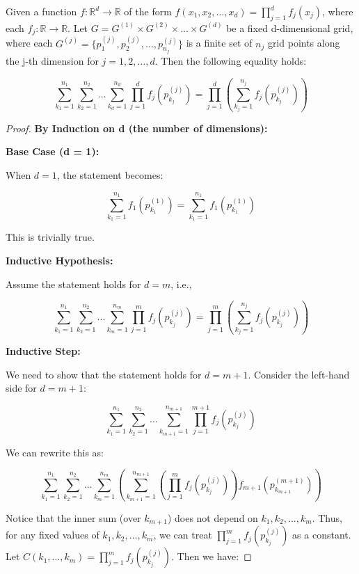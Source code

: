 
\begin{lemma}\label{lemma:switch-sum-product}
Given a function $f: \mathbb{R}^d \rightarrow \mathbb{R}$ of the form $f(x_1, x_2, ..., x_d) = \prod_{j=1}^d f_j(x_j)$, where each $f_j: \mathbb{R} \rightarrow \mathbb{R}$. Let $G = G^{(1)} \times G^{(2)} \times ... \times G^{(d)}$ be a fixed d-dimensional grid, where each $G^{(j)} = \{p_1^{(j)}, p_2^{(j)}, ..., p_{n_j}^{(j)}\}$ is a finite set of $n_j$ grid points along the j-th dimension for $j = 1, 2, ..., d$. Then the following equality holds:

$$
\sum_{k_1=1}^{n_1} \sum_{k_2=1}^{n_2} ... \sum_{k_d=1}^{n_d} \prod_{j=1}^d f_j(p_{k_j}^{(j)}) = \prod_{j=1}^d \left( \sum_{k_j=1}^{n_j} f_j(p_{k_j}^{(j)}) \right)
$$
\end{lemma}
\begin{proof}
\textbf{By Induction on d (the number of dimensions):}

\textbf{Base Case (d = 1):}

When $d=1$, the statement becomes:

$$
\sum_{k_1=1}^{n_1} f_1(p_{k_1}^{(1)}) = \sum_{k_1=1}^{n_1} f_1(p_{k_1}^{(1)})
$$

This is trivially true.

\textbf{Inductive Hypothesis:}

Assume the statement holds for $d = m$, i.e.,

$$
\sum_{k_1=1}^{n_1} \sum_{k_2=1}^{n_2} ... \sum_{k_m=1}^{n_m} \prod_{j=1}^m f_j(p_{k_j}^{(j)}) = \prod_{j=1}^m \left( \sum_{k_j=1}^{n_j} f_j(p_{k_j}^{(j)}) \right)
$$

\textbf{Inductive Step:}

We need to show that the statement holds for $d = m+1$. Consider the left-hand side for $d = m+1$:

$$
\sum_{k_1=1}^{n_1} \sum_{k_2=1}^{n_2} ... \sum_{k_{m+1}=1}^{n_{m+1}} \prod_{j=1}^{m+1} f_j(p_{k_j}^{(j)})
$$

We can rewrite this as:

$$
\sum_{k_1=1}^{n_1} \sum_{k_2=1}^{n_2} ... \sum_{k_m=1}^{n_m} \left( \sum_{k_{m+1}=1}^{n_{m+1}} \left( \prod_{j=1}^m f_j(p_{k_j}^{(j)}) \right) f_{m+1}(p_{k_{m+1}}^{(m+1)}) \right)
$$

Notice that the inner sum (over $k_{m+1}$) does not depend on $k_1, k_2, ..., k_m$. Thus, for any fixed values of $k_1, k_2, ..., k_m$, we can treat $\prod_{j=1}^m f_j(p_{k_j}^{(j)})$ as a constant. Let $C(k_1, ..., k_m) = \prod_{j=1}^m f_j(p_{k_j}^{(j)})$. Then we have:


\end{proof}
